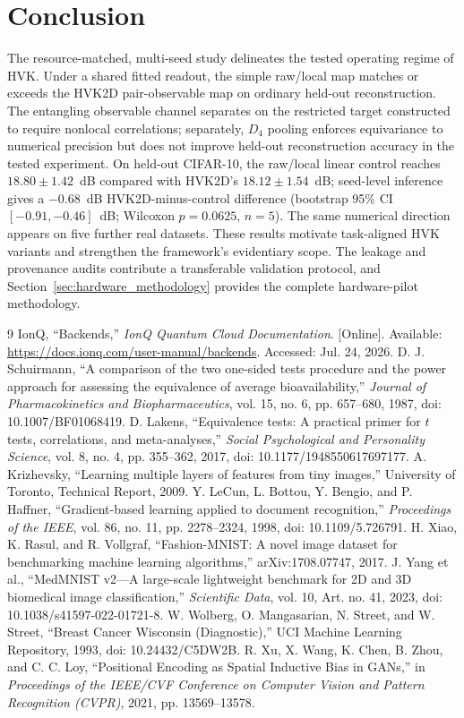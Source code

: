 \documentclass[11pt]{article}
\begin{document}
\section{Conclusion}
The resource-matched, multi-seed study delineates the tested operating regime of HVK. Under a shared fitted readout, the simple raw/local map matches or exceeds the HVK2D pair-observable map on ordinary held-out reconstruction. The entangling observable channel separates on the restricted target constructed to require nonlocal correlations; separately, $D_4$ pooling enforces equivariance to numerical precision but does not improve held-out reconstruction accuracy in the tested experiment. On held-out CIFAR-10, the raw/local linear control reaches $18.80\pm1.42$~dB compared with HVK2D's $18.12\pm1.54$~dB; seed-level inference gives a $-0.68$~dB HVK2D-minus-control difference (bootstrap 95\% CI $[-0.91,-0.46]$~dB; Wilcoxon $p=0.0625$, $n=5$). The same numerical direction appears on five further real datasets. These results motivate task-aligned HVK variants and strengthen the framework's evidentiary scope. The leakage and provenance audits contribute a transferable validation protocol, and Section~\ref{sec:hardware_methodology} provides the complete hardware-pilot methodology.

\begin{thebibliography}{9}
 IonQ, ``Backends,'' \textit{IonQ Quantum Cloud Documentation}. [Online]. Available: \url{https://docs.ionq.com/user-manual/backends}. Accessed: Jul. 24, 2026.
 D. J. Schuirmann, ``A comparison of the two one-sided tests procedure and the power approach for assessing the equivalence of average bioavailability,'' \textit{Journal of Pharmacokinetics and Biopharmaceutics}, vol. 15, no. 6, pp. 657--680, 1987, doi: 10.1007/BF01068419.
 D. Lakens, ``Equivalence tests: A practical primer for $t$ tests, correlations, and meta-analyses,'' \textit{Social Psychological and Personality Science}, vol. 8, no. 4, pp. 355--362, 2017, doi: 10.1177/1948550617697177.
 A. Krizhevsky, ``Learning multiple layers of features from tiny images,'' University of Toronto, Technical Report, 2009.
 Y. LeCun, L. Bottou, Y. Bengio, and P. Haffner, ``Gradient-based learning applied to document recognition,'' \textit{Proceedings of the IEEE}, vol. 86, no. 11, pp. 2278--2324, 1998, doi: 10.1109/5.726791.
 H. Xiao, K. Rasul, and R. Vollgraf, ``Fashion-MNIST: A novel image dataset for benchmarking machine learning algorithms,'' arXiv:1708.07747, 2017.
 J. Yang et al., ``MedMNIST v2---A large-scale lightweight benchmark for 2D and 3D biomedical image classification,'' \textit{Scientific Data}, vol. 10, Art. no. 41, 2023, doi: 10.1038/s41597-022-01721-8.
 W. Wolberg, O. Mangasarian, N. Street, and W. Street, ``Breast Cancer Wisconsin (Diagnostic),'' UCI Machine Learning Repository, 1993, doi: 10.24432/C5DW2B.
 R. Xu, X. Wang, K. Chen, B. Zhou, and C. C. Loy, ``Positional Encoding as Spatial Inductive Bias in GANs,'' in \textit{Proceedings of the IEEE/CVF Conference on Computer Vision and Pattern Recognition (CVPR)}, 2021, pp. 13569--13578.
\end{thebibliography}
\end{document}

